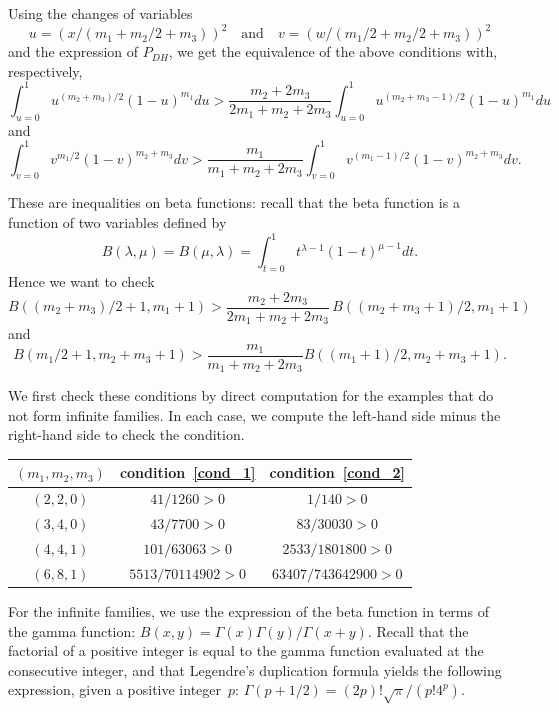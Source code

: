\documentclass[JEP,XML,SOM,Unicode, NoEqCountersInSection, NoFloatCountersInSection]{cedram}
\theoremstyle{plain}
\theoremstyle{definition}
\begin{document}
Using the changes of variables $$u=(x/(m_1+m_2/2+m_3))^2 \quad\text{and}\quad v=(w/(m_1/2+m_2/2+m_3))^2$$ and the expression of $P_{DH}$,
we get the equivalence of the above conditions with, respectively,
\begin{equation*}
\int_{u=0}^1 u^{(m_2+m_3)/2}(1-u)^{m_1}du
>
\frac{m_2+2m_3}{2m_1+m_2+2m_3}\int_{u=0}^1 u^{(m_2+m_3-1)/2}(1-u)^{m_1}du
\end{equation*}
and
\begin{equation*}
\int_{v=0}^1 v^{m_1/2}(1-v)^{m_2+m_3}dv
>
\frac{m_1}{m_1+m_2+2m_3}\int_{v=0}^1 v^{(m_1-1)/2}(1-v)^{m_2+m_3}dv.
\end{equation*}

These are inequalities on beta functions: recall that the beta function
is a function of two variables defined by
\begin{equation*}
B(\lambda,\mu)=B(\mu,\lambda)=\int_{t=0}^{1}t^{\lambda-1}(1-t)^{\mu-1}dt.
\end{equation*}
Hence we want to check
\begin{equation}
\label{cond_1}
B((m_2+m_3)/2+1,m_1+1)>\frac{m_2+2m_3}{2m_1+m_2+2m_3}\,B((m_2+m_3+1)/2,m_1+1)
\end{equation}
and
\begin{equation}
\label{cond_2}
B(m_1/2+1,m_2+m_3+1)>\frac{m_1}{m_1+m_2+2m_3}B((m_1+1)/2,m_2+m_3+1).
\end{equation}

We first check these conditions by direct computation for the
examples that do not form infinite families. In each case, we
compute the left-hand side minus the right-hand side to check the condition.
\par\smallskip\begin{center}
\begin{tabular}{ccc}
\toprule
$(m_1,m_2,m_3)$ & condition~\eqref{cond_1} & condition~\eqref{cond_2} \\
\midrule
$(2,2,0)$ & $41/1260>0$ & $1/140>0$ \\
$(3,4,0)$ & $43/7700>0$ & $83/30030>0$ \\
$(4,4,1)$ & $101/63063>0$ & $2533/1801800>0$ \\
$(6,8,1)$ & $5513/70114902>0$ & $63407/743642900>0$ \\
\bottomrule
\end{tabular}
\end{center}
\par\smallskip

For the infinite families,
we use the expression of the beta function in terms
of the gamma function: $B(x,y)=\Gamma(x)\Gamma(y)/\Gamma(x+y)$.
Recall that the factorial of a positive integer is equal to the gamma function
evaluated at the consecutive integer, and that Legendre's duplication formula
yields the following expression, given a positive integer~$p$:
$\Gamma(p+1/2)=(2p)!\sqrt{\pi}/(p!4^p)$.
\end{document}
